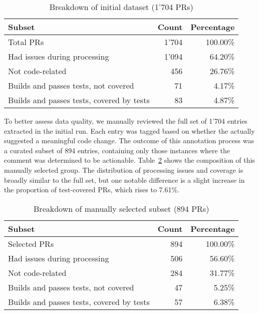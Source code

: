 \begin{table}[ht]
	\centering
	\begin{tabular}{lrr}
		\toprule
		\textbf{Subset}                           & \textbf{Count} & \textbf{Percentage} \\
		\midrule
		Total PRs                                 & 1'704          & 100.00\%            \\
		Had issues during processing              & 1'094          & 64.20\%             \\
		Not code-related                          & 456            & 26.76\%             \\
		Builds and passes tests, not covered      & 71             & 4.17\%              \\
		Builds and passes tests, covered by tests & 83             & 4.87\%              \\
		\bottomrule
	\end{tabular}
	\caption{Breakdown of initial dataset (1'704 PRs)}
	\label{tab:initial-distribution}
\end{table}

To better assess data quality, we manually reviewed the full set of 1'704 entries extracted in the
initial run. Each entry was tagged based on whether the \revComment actually suggested a meaningful
code change. The outcome of this annotation process was a curated subset of 894 entries, containing
only those instances where the comment was determined to be actionable.
Table~\ref{tab:manual-selection-distribution} shows the composition of this manually selected group.
The distribution of processing issues and coverage is broadly similar to the full set, but one
notable difference is a slight increase in the proportion of test-covered PRs, which rises to
7.61\%.

\begin{table}[ht]
	\centering
	\begin{tabular}{lrr}
		\toprule
		\textbf{Subset}                           & \textbf{Count} & \textbf{Percentage} \\
		\midrule
		Selected PRs                              & 894            & 100.00\%            \\
		Had issues during processing              & 506            & 56.60\%             \\
		Not code-related                          & 284            & 31.77\%             \\
		Builds and passes tests, not covered      & 47             & 5.25\%              \\
		Builds and passes tests, covered by tests & 57             & 6.38\%              \\
		\bottomrule
	\end{tabular}
	\caption{Breakdown of manually selected subset (894 PRs)}
	\label{tab:manual-selection-distribution}
\end{table}

